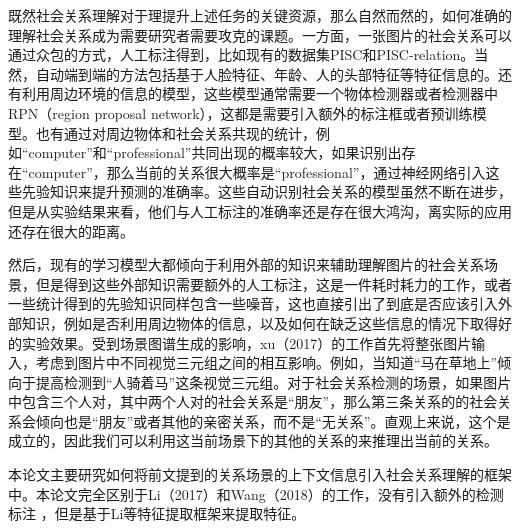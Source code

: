 既然社会关系理解对于理提升上述任务的关键资源，那么自然而然的，如何准确的理解社会关系成为需要研究者需要攻克的课题。一方面，一张图片的社会关系可以通过众包的方式，人工标注得到，比如现有的数据集PISC\cite{li2017dual-glance}和PISC-relation\cite{sun2017a}。当然，自动端到端的方法包括基于人脸特征、年龄、人的头部特征等特征信息的\cite{sun2017a,zhang2015learning}。还有利用周边环境的信息的模型\cite{li2017dual-glance,wang2018deep}，这些模型通常需要一个物体检测器或者检测器中RPN（region proposal network），这都是需要引入额外的标注框或者预训练模型。也有通过对周边物体和社会关系共现的统计，例如``computer''和``professional''共同出现的概率较大，如果识别出存在``computer''，那么当前的关系很大概率是``professional''，通过神经网络引入这些先验知识来提升预测的准确率。这些自动识别社会关系的模型虽然不断在进步，但是从实验结果来看，他们与人工标注的准确率还是存在很大鸿沟，离实际的应用还存在很大的距离。

然后，现有的学习模型大都倾向于利用外部的知识来辅助理解图片的社会关系场景，但是得到这些外部知识需要额外的人工标注，这是一件耗时耗力的工作，或者一些统计得到的先验知识同样包含一些噪音，这也直接引出了到底是否应该引入外部知识，例如是否利用周边物体的信息，以及如何在缺乏这些信息的情况下取得好的实验效果。受到场景图谱生成\cite{xu2017scene}的影响，xu（2017）的工作首先将整张图片输入，考虑到图片中不同视觉三元组之间的相互影响。例如，当知道``马在草地上''倾向于提高检测到``人骑着马''这条视觉三元组。对于社会关系检测的场景，如果图片中包含三个人对，其中两个人对的社会关系是``朋友''，那么第三条关系的的社会关系会倾向也是``朋友''或者其他的亲密关系，而不是``无关系''。直观上来说，这个是成立的，因此我们可以利用这当前场景下的其他的关系的来推理出当前的关系。


本论文主要研究如何将前文提到的关系场景的上下文信息引入社会关系理解的框架中。本论文完全区别于Li（2017）\cite{li2017dual-glance}和Wang（2018）\cite{wang2018deep}的工作，没有引入额外的检测标注
，但是基于Li等特征提取框架来提取特征。

